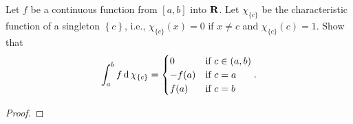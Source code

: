 \begin{problem}
Let $f$ be a continuous function from $[a,b]$ into $\mathbf{R}$. Let
$\chi_{\{c\}}$ be the characteristic function of a singleton
$\left\{c\right\}$, i.e., $\chi_{\{c\}}(x)=0$ if $x\neq c$ and
$\chi_{\{c\}}(c)=1$. Show that
\[
\int_a^b f\operatorname{d}\chi_{\{c\}}=
\begin{cases}
0&\text{if $c\in(a,b)$}\\
-f(a)&\text{if $c=a$}\\
f(a)&\text{if $c=b$}
\end{cases}.
\]
\end{problem}
\begin{proof}
\end{proof}

